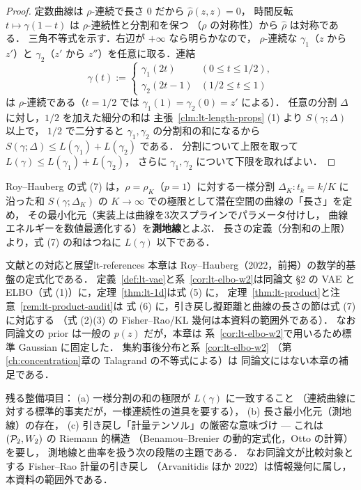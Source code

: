 \begin{proof}
  定数曲線は $\rho$-連続で長さ $0$ だから $\hat\rho(z,z)=0$，
  時間反転 $t\mapsto\gamma(1-t)$ は $\rho$-連続性と分割和を保つ
  （$\rho$ の対称性）から $\hat\rho$ は対称である．
  三角不等式を示す．右辺が $+\infty$ なら明らかなので，
  $\rho$-連続な $\gamma_1$（$z$ から $z'$）と
  $\gamma_2$（$z'$ から $z''$）を任意に取る．連結
  \[
    \gamma(t):=
    \begin{cases}
      \gamma_1(2t)&(0\leq t\leq1/2),\\
      \gamma_2(2t-1)&(1/2\leq t\leq1)
    \end{cases}
  \]
  は $\rho$-連続である（$t=1/2$ では
  $\gamma_1(1)=\gamma_2(0)=z'$ による）．
  任意の分割 $\Delta$ に対し，$1/2$ を加えた細分の和は
  主張~\ref{clm:lt-length-props} (1) より $S(\gamma;\Delta)$ 以上で，
  $1/2$ で二分すると $\gamma_1,\gamma_2$ の分割和の和になるから
  $S(\gamma;\Delta)\leq L(\gamma_1)+L(\gamma_2)$ である．
  分割について上限を取って
  $L(\gamma)\leq L(\gamma_1)+L(\gamma_2)$，
  さらに $\gamma_1,\gamma_2$ について下限を取ればよい．
\end{proof}

Roy--Hauberg の式 (7) は，$\rho=\rho_K$（$p=1$）に対する一様分割
$\Delta_K\colon t_k=k/K$ に沿った和 $S(\gamma;\Delta_K)$ の
$K\to\infty$ での極限として潜在空間の曲線の「長さ」を定め，
その最小化元（実装上は曲線を3次スプラインでパラメータ付けし，
曲線エネルギーを数値最適化する）を\textbf{測地線}とよぶ．
長さの定義（分割和の上限）より，式 (7) の和はつねに
$L(\gamma)$ 以下である．

\begin{remark}{文献との対応と展望}{lt-references}
  本章は Roy--Hauberg（2022，前掲）の数学的基盤の定式化である．
  定義~\ref{def:lt-vae}と系~\ref{cor:lt-elbo-w2}は同論文 §2 の
  VAE と ELBO（式 (1)）に，定理~\ref{thm:lt-1d}は式 (5) に，
  定理~\ref{thm:lt-product}と注意~\ref{rem:lt-product-audit}は
  式 (6) に，引き戻し擬距離と曲線の長さの節は式 (7) に対応する
  （式 (2)(3) の Fisher--Rao/KL 幾何は本資料の範囲外である）．
  なお同論文の prior は一般の $p(z)$ だが，本章は
  系~\ref{cor:lt-elbo-w2}で用いるため標準 Gaussian に固定した．
  集約事後分布と系~\ref{cor:lt-elbo-w2}
  （第\ref{ch:concentration}章の Talagrand の不等式による）は
  同論文にはない本章の補足である．

  残る整備項目：
  (a) 一様分割の和の極限が $L(\gamma)$ に一致すること
  （連続曲線に対する標準的事実だが，一様連続性の道具を要する），
  (b) 長さ最小化元（測地線）の存在，
  (c) 引き戻し「計量テンソル」の厳密な意味づけ —
  これは $(\mathcal{P}_{2},W_2)$ の Riemann 的構造
  （Benamou--Brenier の動的定式化，Otto の計算）を要し，
  測地線と曲率を扱う次の段階の主題である．
  なお同論文が比較対象とする Fisher--Rao 計量の引き戻し
  （Arvanitidis ほか 2022）は情報幾何に属し，本資料の範囲外である．
\end{remark}
